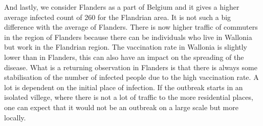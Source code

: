 \documentclass[runningheads]{llncs}
\begin{document}
    And lastly, we consider Flanders as a part of Belgium and it gives a higher average infected count of 260 for the Flandrian area. It is not such a big difference with the average of Flanders. There is now higher traffic of commuters in the region of Flanders because there can be individuals who live in Wallonia but work in the Flandrian region. The vaccination rate in Wallonia is slightly lower than in Flanders, this can also have an impact on the spreading of the disease. What is a returning observation in Flanders is that there is always some stabilisation of the number of infected people due to the high vaccination rate. A lot is dependent on the initial place of infection. If the outbreak starts in an isolated villege, where there is not a lot of traffic to the more residential places, one can expect that it would not be an outbreak on a large scale but more locally.
	
\end{document}
